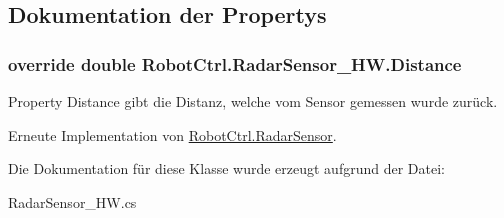 \subsection{Dokumentation der Propertys}
\hypertarget{class_robot_ctrl_1_1_radar_sensor___h_w_a0eb1060a6e45bb29fdbf99e35481311e}{
\subsubsection[{Distance}]{\setlength{\rightskip}{0pt plus 5cm}override double RobotCtrl.RadarSensor\_\-HW.Distance}}
\label{class_robot_ctrl_1_1_radar_sensor___h_w_a0eb1060a6e45bb29fdbf99e35481311e}
Property Distance gibt die Distanz, welche vom Sensor gemessen wurde zur\"{u}ck. 

Erneute Implementation von \hyperlink{class_robot_ctrl_1_1_radar_sensor_a1be5541f3153ba40736f7a9fa292375b}{RobotCtrl.RadarSensor}.



Die Dokumentation für diese Klasse wurde erzeugt aufgrund der Datei:\begin{DoxyCompactItemize}
\item 
RadarSensor\_\-HW.cs\end{DoxyCompactItemize}
